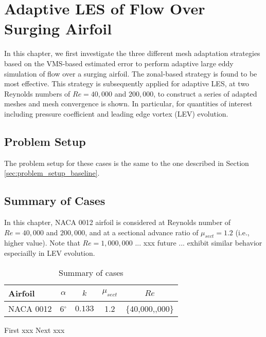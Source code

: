 \chapter{Adaptive LES of Flow Over Surging Airfoil}

In this chapter, we first investigate the three different mesh adaptation strategies based on the VMS-based estimated error to perform adaptive large eddy simulation of flow over a surging airfoil.
The zonal-based strategy is found to be most effective. This strategy is subsequently applied for adaptive LES, at two Reynolds numbers of $Re=40,000$ and $200,000$, to construct a series of adapted meshes and mesh convergence is shown. In particular, for quantities of interest including pressure coefficient and leading edge vortex (LEV) evolution.

\section{Problem Setup}

The problem setup for these cases is the same to the one described in Section \ref{sec:problem_setup_baseline}.

\section{Summary of Cases}

In this chapter, NACA 0012 airfoil is considered at Reynolds number of $Re=40,000$ and $200,000$, and at a sectional advance ratio of $\mu_{sect}=1.2$ (i.e., higher value). Note that $Re=1,000,000$ ... xxx future ... exhibit similar behavior especiailly in LEV evolution.

\begin{table}[H]
	\centering
	\caption{Summary of cases}
	\label{table:summary_cases}
	\begin{tabular}{|l|c|c|c|c|}
		\hline
		Airfoil   & $\alpha$ & $k$ & $\mu_{sect}$ & $Re$ \\
		\hline
		\hline
		NACA 0012 & 6$^\circ$ & $0.133$ &  1.2 & \{40,000,\; 200,000\} \\
	\hline
	\end{tabular}
\end{table}

First xxx
Next xxx

